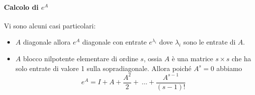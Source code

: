 \paragraph{Calcolo di \(e^{A}\)} Vi sono alcuni casi particolari:
\begin{itemize}[label = --]
    \item \(A\) diagonale allora \(e^{A}\) diagonale con entrate
        \(e^{\lambda_{i}}\) dove \(\lambda_{i}\) sono le entrate di \(A\).
    \item \(A\) blocco nilpotente elementare di ordine \(s\), ossia \(A\) è una
        matrice \(s \times  s\) che ha solo entrate di valore 1 sulla
        sopradiagonale. Allora poiché \(A^{s} = 0\) abbiamo
        \[
          e^{A} = I + A + \frac{A^2}{2} +~\dots + \frac{A^{s-1}}{(s-1)!}
        \]
\end{itemize}


